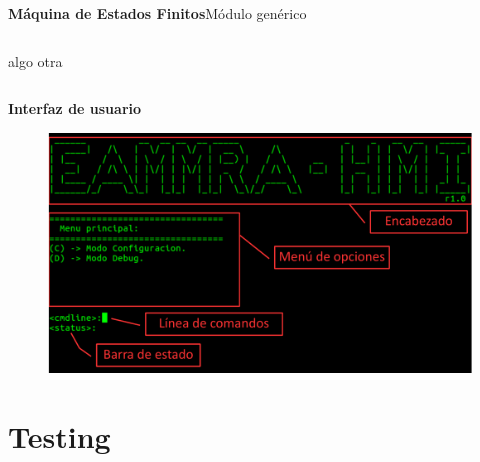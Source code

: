 \documentclass[11pt]{beamer}
\begin{document}
\begin{frame}{\textbf{\LARGE{Máquina de Estados Finitos}}}{Módulo genérico}
	\vspace{-.7cm}
	\begin{columns}
	  algo
	  otra
	\end{columns}
\end{frame}




\begin{frame}{\textbf{\LARGE{Interfaz de usuario}}}{}
	\vspace{-.7cm}
	\centering
	\begin{figure}[H]
		\includegraphics[width=\textwidth]{./imagenes/interfaz_detalles.pdf}
	\end{figure}	
\end{frame}


\section{Testing}
\end{document}
